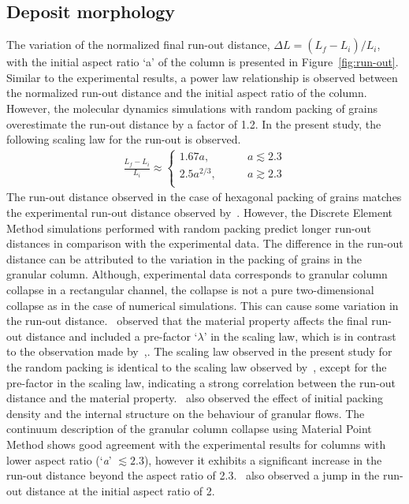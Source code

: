 \subsection{Deposit morphology}
The variation of the normalized final run-out distance, $\Delta L = 
(L_{\textit{f}}-L_{\textit{i}})/L_{\textit{i}}$, with the initial aspect ratio 
`a' of the column is presented in Figure~\ref{fig:run-out}. Similar to the 
experimental results, a power law relationship is observed between the 
normalized run-out distance and the initial aspect ratio of the column. 
However, the molecular dynamics simulations with random packing of grains 
overestimate the run-out distance by a factor of 1.2. In the present study, the 
following scaling law for the run-out is observed.
\begin{align}
\frac{L_{\textit{f}}-L_{\textit{i}}}{L_{\textit{i}}} \approx  
\begin{cases}
1.67 a, &\qquad \textit{a}\lesssim 2.3 \\
2.5 a^{2/3}, &\qquad \textit{a} \gtrsim 2.3 \\
\end{cases}
\end{align}
The run-out distance observed in the case of hexagonal packing of grains 
matches the experimental run-out distance observed by~\citet{Lajeunesse2004}. 
However, the Discrete Element Method simulations performed with random packing 
predict longer run-out distances in comparison with the experimental data. The 
difference in the run-out distance can be attributed to the variation in the 
packing of grains in the granular column. Although, experimental data 
corresponds to granular column collapse in a rectangular channel, the collapse 
is not a pure two-dimensional collapse as in the case of numerical simulations. 
This can cause some variation in the run-out distance.~\citet{Balmforth2005} 
observed that the material property affects the final run-out distance and 
included a pre-factor `$\lambda$' in the scaling law, which is in contrast to 
the observation made by~\citet{Lube2005},. The scaling law observed in the 
present study for the random packing is identical to the scaling law observed 
by~\citet{Lajeunesse2004}, except for the pre-factor in the scaling law, 
indicating a strong correlation between the run-out distance and the material 
property.~\citet{Daerr1999} also observed the effect of initial packing density 
and the internal structure on the behaviour of granular flows. The continuum 
description of the granular column collapse using Material Point Method shows 
good agreement with the experimental results for columns with lower aspect 
ratio (`\textit{a}' $\lesssim 2.3$), however it exhibits a significant increase 
in the run-out distance beyond the aspect ratio of 2.3.~\citet{Bandara2013} 
also observed a jump in the run-out distance at the initial aspect ratio of 2.

